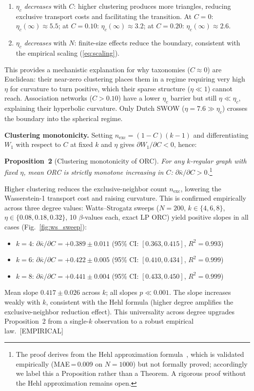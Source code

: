 \documentclass[11pt,a4paper]{article}
\newcommand{\kbar}{\bar{\kappa}}
\newcommand{\etac}{\eta_c}
\begin{document}
\begin{enumerate}
    \item $\etac$ \emph{decreases} with $C$: higher clustering produces more triangles, reducing exclusive transport costs and facilitating the transition. At $C = 0$: $\etac(\infty) \approx 5.5$; at $C = 0.10$: $\etac(\infty) \approx 3.2$; at $C = 0.20$: $\etac(\infty) \approx 2.6$.
    \item $\etac$ \emph{decreases} with $N$: finite-size effects reduce the boundary, consistent with the empirical scaling (\ref{eq:scaling}).
\end{enumerate}

This provides a mechanistic explanation for why taxonomies ($C \approx 0$) are Euclidean: their near-zero clustering places them in a regime requiring very high $\eta$ for curvature to turn positive, which their sparse structure ($\eta \ll 1$) cannot reach. Association networks ($C > 0.10$) have a lower $\etac$ barrier but still $\eta \ll \etac$, explaining their hyperbolic curvature. Only Dutch SWOW ($\eta = 7.6 \gg \etac$) crosses the boundary into the spherical regime.

\textbf{Clustering monotonicity.} Setting $n_{\mathrm{exc}} = (1-C)(k-1)$ and differentiating $W_1$ with respect to $C$ at fixed $k$ and $\eta$ gives $\partial W_1/\partial C < 0$, hence:

\medskip
\noindent\textbf{Proposition~2} (Clustering monotonicity of ORC).
\emph{For any $k$-regular graph with fixed $\eta$, mean ORC is strictly monotone increasing in $C$:
$\partial\kbar/\partial C > 0$.}\footnote{The proof derives from the Hehl approximation formula~\cite{hehl2024curvature}, which is validated empirically (MAE\,=\,0.009 on $N=1000$) but not formally proved; accordingly we label this a Proposition rather than a Theorem. A rigorous proof without the Hehl approximation remains open.}
\medskip

Higher clustering reduces the exclusive-neighbor count $n_{\mathrm{exc}}$, lowering the Wasserstein-1 transport cost and raising curvature. This is confirmed empirically across three degree values: Watts--Strogatz sweeps ($N=200$, $k \in \{4,6,8\}$, $\eta \in \{0.08, 0.18, 0.32\}$, 10 $\beta$-values each, exact LP ORC) yield positive slopes in all cases (Fig.~\ref{fig:ws_sweep}):
\begin{itemize}
  \item $k=4$: $\partial\kbar/\partial C = +0.389 \pm 0.011$ (95\% CI: $[0.363, 0.415]$, $R^2 = 0.993$)
  \item $k=6$: $\partial\kbar/\partial C = +0.422 \pm 0.005$ (95\% CI: $[0.410, 0.434]$, $R^2 = 0.999$)
  \item $k=8$: $\partial\kbar/\partial C = +0.441 \pm 0.004$ (95\% CI: $[0.433, 0.450]$, $R^2 = 0.999$)
\end{itemize}
Mean slope $0.417 \pm 0.026$ across $k$; all slopes $p \ll 0.001$. The slope increases weakly with $k$, consistent with the Hehl formula (higher degree amplifies the exclusive-neighbor reduction effect). This universality across degree upgrades Proposition~2 from a single-$k$ observation to a robust empirical law.~[EMPIRICAL]
\end{document}
